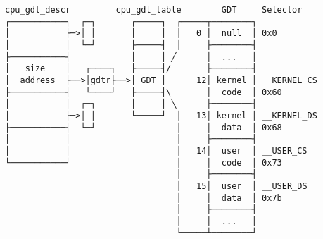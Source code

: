 \documentclass[varwidth=40em]{standalone}
\begin{document}
\begin{verbatim}
cpu_gdt_descr         cpu_gdt_table        GDT     Selector
┌───────────┐  ┌─┐       ┌─────┐  ┌─────┬────────┐
│           ├─>│ │       │     │  │   0 │  null  │ 0x0
│           │  └─┘       ├─────┤  │     ├────────┤
├───────────┤            │     │ ╱      │  ...   │
│   size    │   ┌────┐   ├─────┤/       ├────────┤
│  address  ├──>│gdtr├──>│ GDT │      12│ kernel │ __KERNEL_CS
├───────────┤   └────┘   ├─────┤\       │  code  │ 0x60
│           │  ┌─┐       │     │ ╲      ├────────┤
│           ├─>│ │       └─────┘  │   13│ kernel │ __KERNEL_DS
├───────────┤  └─┘                │     │  data  │ 0x68
│           │                     │     ├────────┤
│           │                     │   14│  user  │ __USER_CS
└───────────┘                     │     │  code  │ 0x73
                                  │     ├────────┤
                                  │   15│  user  │ __USER_DS
                                  │     │  data  │ 0x7b
                                  │     ├────────┤
                                  │     │  ...   │
                                  └─────┴────────┘
\end{verbatim}
\end{document}
